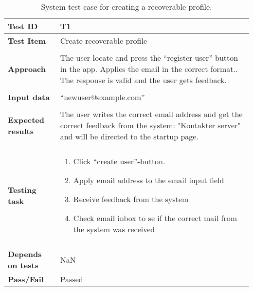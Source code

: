 \begin{table}[H]
	\centering
	\caption{System test case for creating a recoverable profile.}
	\begin{adjustbox}{center}
	\begin{tabular}[b]{ | l | l  |}
		\hline
		\textbf{Test ID} & T1  \\ \hline
		\textbf{Test Item} & Create recoverable profile \\ \hline&\\[-2ex]
		\textbf{Approach} & \begin{minipage}{5in}The user locate and press the “register user” button in the app. Applies the email in the correct format.. The response is valid and the user gets feedback. \end{minipage}\\ &\\[-2ex]\hline
		\textbf{Input data} &  “newuser@example.com”\\ \hline&\\[-2ex]
		
		\textbf{Expected results} & \begin{minipage}{5in}The user writes the correct email address and get the correct feedback from the system: "Kontakter server" and will be directed to the startup page.\end{minipage}\\ \hline&\\[-2ex]
		
		\textbf{Testing task} & \begin{minipage}{5in}
			\begin{enumerate}[noitemsep]
				\item Click  “create user”-button.
				\item Apply email address to the email input field 
				\item Receive feedback from the system
				\item Check email inbox to se if the correct mail from the system was received 
			\end{enumerate} \end{minipage}
			\\&\\[-2ex] \hline
			\textbf{Depends on tests}& NaN \\ \hline	
			\textbf{Pass/Fail} & Passed \\\hline				
		\end{tabular}
		\end{adjustbox}
		\label{Tab:systemtest1}
	\end{table}
			
